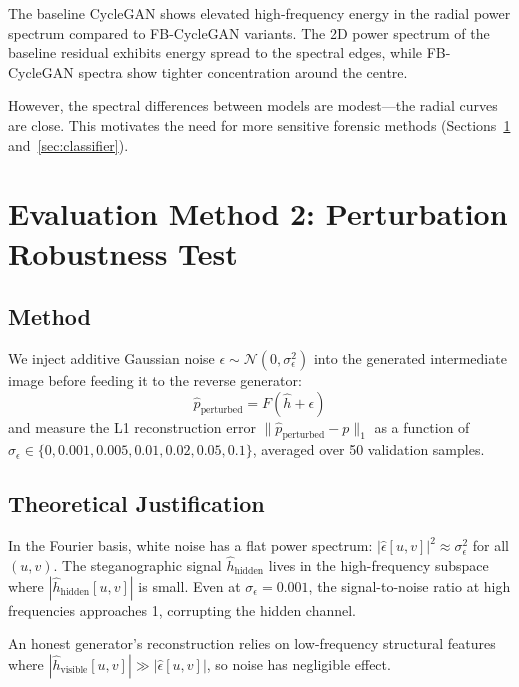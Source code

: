 \documentclass[11pt,a4paper]{article}
\theoremstyle{definition}
\begin{document}
The baseline CycleGAN shows elevated high-frequency energy in the radial power spectrum compared to FB-CycleGAN variants. The 2D power spectrum of the baseline residual exhibits energy spread to the spectral edges, while FB-CycleGAN spectra show tighter concentration around the centre.

However, the spectral differences between models are modest---the radial curves are close. This motivates the need for more sensitive forensic methods (Sections~\ref{sec:perturb} and~\ref{sec:classifier}).

\section{Evaluation Method 2: Perturbation Robustness Test}
\label{sec:perturb}

\subsection{Method}

We inject additive Gaussian noise $\epsilon \sim \mathcal{N}(0, \sigma_\epsilon^2)$ into the generated intermediate image before feeding it to the reverse generator:
\begin{equation}
    \hat{p}_{\text{perturbed}} = F(\hat{h} + \epsilon)
\end{equation}
and measure the L1 reconstruction error $\|\hat{p}_{\text{perturbed}} - p\|_1$ as a function of $\sigma_\epsilon \in \{0, 0.001, 0.005, 0.01, 0.02, 0.05, 0.1\}$, averaged over 50 validation samples.

\subsection{Theoretical Justification}

In the Fourier basis, white noise has a flat power spectrum: $|\hat{\epsilon}[u,v]|^2 \approx \sigma_\epsilon^2$ for all $(u,v)$. The steganographic signal $\hat{h}_{\text{hidden}}$ lives in the high-frequency subspace where $|\hat{h}_{\text{hidden}}[u,v]|$ is small. Even at $\sigma_\epsilon = 0.001$, the signal-to-noise ratio at high frequencies approaches 1, corrupting the hidden channel.

An honest generator's reconstruction relies on low-frequency structural features where $|\hat{h}_{\text{visible}}[u,v]| \gg |\hat{\epsilon}[u,v]|$, so noise has negligible effect.
\end{document}
